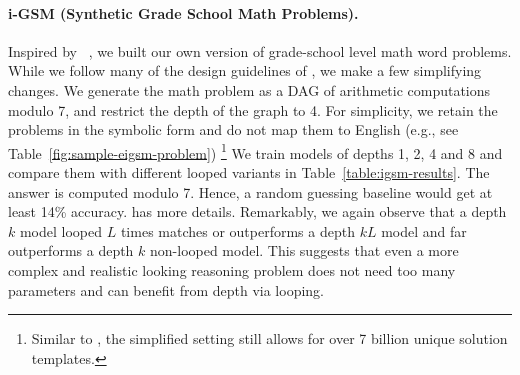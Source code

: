 \paragraph{i-GSM (Synthetic Grade School Math Problems).} Inspired by ~\cite{ye2024physics}, we built our own version of grade-school level math word problems. While we follow many of the design guidelines of \cite{ye2024physics}, we make a few simplifying changes. 
We generate the math problem as a DAG of arithmetic computations modulo 7, and restrict the depth of the graph to 4. For simplicity, we retain the problems in the symbolic form and do not map them to English (e.g., see Table~\ref{fig:sample-eigsm-problem}) \footnote{Similar to \cite{ye2024physics}, the simplified setting still allows for over 7 billion unique solution templates.} We train models of depths 1, 2, 4 and 8 and compare them with different looped variants in Table~\ref{table:igsm-results}. The answer is computed modulo 7. Hence, a random guessing baseline would get at least 14\% accuracy.   has more details. Remarkably, we again observe that a depth $k$ model looped $L$ times matches or outperforms a depth $kL$ model and far outperforms a depth $k$ non-looped model. 
This suggests that even a more complex and realistic looking reasoning problem does not need too many parameters and can benefit from depth via looping.




